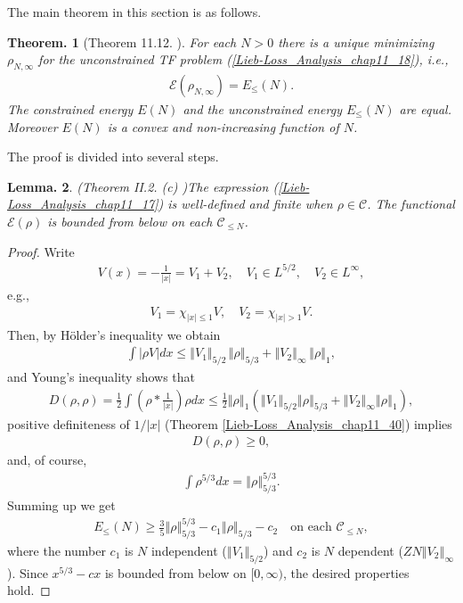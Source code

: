 \documentclass[openany, a4paper, oneside]{jsbook}
\theoremstyle{break}
\newtheorem{thm}{Theorem.}[section]
\newtheorem{lem}[thm]{Lemma.}
\theoremstyle{breakdefn}
\newcommand{\abs}[1]{\left|#1\right|}
\newcommand{\norm}[1]{\left\Vert#1\right\Vert}
\newcommand{\rbk}[1]{\left (#1\right)}
\newcommand{\calC}{\mathcal{C}}
\newcommand{\calE}{\mathcal{E}}
\newcommand{\EleqN}{E_{\leq}(N)}
\newcommand{\rhoNinfty}{\rho_{N, \infty}}
\begin{document}
The main theorem in this section is as follows.
\begin{thm}[Theorem 11.12. \cite{LiebLoss1}]\label{Lieb-Loss_Analysis_chap11_33}
 For each $N > 0$ there is a unique minimizing $\rhoNinfty$ for the unconstrained TF problem (\ref{Lieb-Loss_Analysis_chap11_18}), i.e.,
 \begin{align}
  \calE \rbk{\rhoNinfty}
  =
  E_{\leq} (N).
 \end{align}
 The constrained energy $E (N)$ and the unconstrained energy $E_{\leq} (N)$ are equal.
 Moreover $E (N)$ is a convex and non-increasing function of $N$.
\end{thm}
The proof is divided into several steps.
\begin{lem}\textup{(Theorem II.2. (c) \cite{LiebSimon1})}\label{Lieb-Loss_Analysis_chap11_19}
 The expression \textup{(\ref{Lieb-Loss_Analysis_chap11_17})} is well-defined and finite when $\rho \in \calC$.
 The functional $\calE \rbk{\rho}$ is bounded from below on each $\calC_{\leq N}$.
\end{lem}
\begin{proof}
Write
\begin{align}
 V (x)
 =
 -\frac{1}{\abs{x}}
 =
 V_1 + V_2, \quad V_1 \in L^{5/2}, \quad V_2 \in L^{\infty},
\end{align}
e.g.,
\begin{align}
 V_1 = \chi_{\abs{x} \leq 1} V, \quad
 V_2 = \chi_{\abs{x} > 1} V.
\end{align}
Then, by H\"older's inequality we obtain
\begin{align}
 \int \abs{\rho V} dx
 \leq
 \norm{V_1}_{5/2} \, \norm{\rho}_{5/3} + \norm{V_2}_{\infty} \, \norm{\rho}_1,
\end{align}
and Young's inequality shows that
\begin{align}
 D (\rho, \rho)
 =
 \frac{1}{2} \int \rbk{\rho * \frac{1}{\abs{x}}} \rho dx
 \leq
 \frac{1}{2} \norm{\rho}_1 \rbk{\norm{V_1}_{5/2} \norm{\rho}_{5/3} + \norm{V_2}_{\infty} \norm{\rho}_1},
\end{align}
positive definiteness of $1/\abs{x}$ (Theorem \ref{Lieb-Loss_Analysis_chap11_40}) implies
\begin{align}
 D (\rho, \rho)
 \geq 0,
\end{align}
and, of course,
\begin{align}
 \int \rho^{5/3} dx
 =
 \norm{\rho}_{5/3}^{5/3}.
\end{align}
Summing up we get
\begin{align}
 \EleqN
 \geq
 \frac{3}{5} \norm{\rho}_{5/3}^{5/3} - c_1 \norm{\rho}_{5/3} - c_2 \quad \text{on each } \calC_{\leq N}, \label{Lieb-Loss_Analysis_chap11_21}
\end{align}
where the number $c_1$ is $N$ independent ($\norm{V_1}_{5/2}$) and $c_2$ is $N$ dependent ($ZN \norm{V_2}_{\infty}$).
Since $x^{5/3} - c x$ is bounded from below on $[0, \infty)$, the desired properties hold.
\end{proof}
\end{document}
